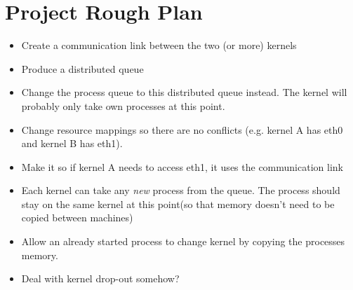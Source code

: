 \documentclass[11pt, a4paper]{article}
\begin{document}
\section{Project Rough Plan}
\begin{itemize}
	\item Create a communication link between the two (or more) kernels
	
	\item Produce a distributed queue
	
	\item Change the process queue to this distributed queue instead. The 
	kernel will probably only take own processes at this point.
	
	\item Change resource mappings so there are no conflicts (e.g. kernel 
	A has eth0 and kernel B has eth1).
	
	\item Make it so if kernel A needs to access eth1, it uses the 
	communication link
	
	\item Each kernel can take any \textit{new} process from the queue. The 
	process should stay on the same kernel at this point(so that memory doesn't 
	need to be copied between machines)
	
	\item Allow an already started process to change kernel by copying the 
	processes memory.
	
	\item Deal with kernel drop-out somehow?
	
\end{itemize}
\end{document}
